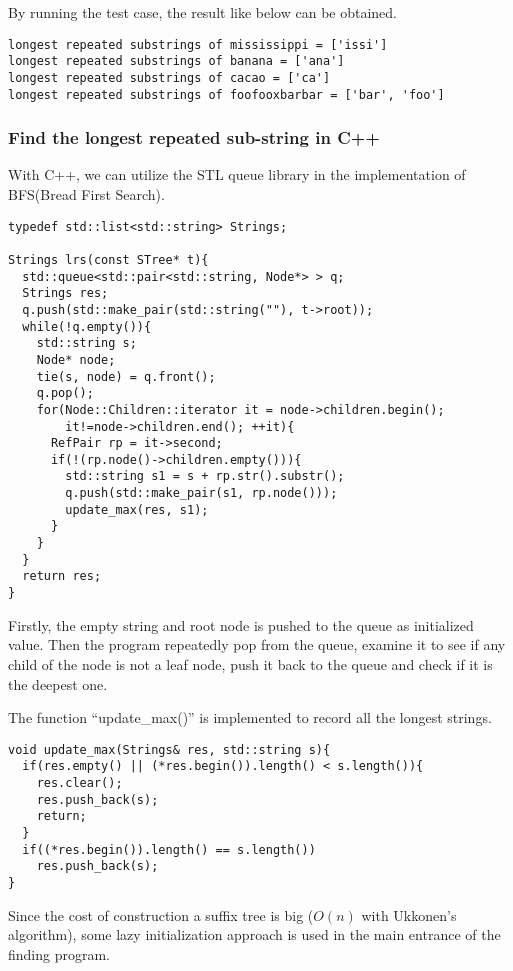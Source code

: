 \documentclass{article}
\begin{document}
By running the test case, the result like below can be obtained.

\begin{verbatim}
longest repeated substrings of mississippi = ['issi']
longest repeated substrings of banana = ['ana']
longest repeated substrings of cacao = ['ca']
longest repeated substrings of foofooxbarbar = ['bar', 'foo']
\end{verbatim}

\subsubsection*{Find the longest repeated sub-string in C++}
With C++, we can utilize the STL queue library in the implementation
of BFS(Bread First Search). 

\lstset{language=C++}
\begin{lstlisting}
typedef std::list<std::string> Strings;

Strings lrs(const STree* t){
  std::queue<std::pair<std::string, Node*> > q;
  Strings res;
  q.push(std::make_pair(std::string(""), t->root));
  while(!q.empty()){
    std::string s;
    Node* node;
    tie(s, node) = q.front();
    q.pop();
    for(Node::Children::iterator it = node->children.begin();
        it!=node->children.end(); ++it){
      RefPair rp = it->second;
      if(!(rp.node()->children.empty())){
        std::string s1 = s + rp.str().substr();
        q.push(std::make_pair(s1, rp.node()));
        update_max(res, s1);
      }
    }
  }
  return res;
} 
\end{lstlisting}

Firstly, the empty string and root node is pushed to the queue
as initialized value. Then the program repeatedly pop from the queue,
examine it to see if any child of the node is not a leaf node,
push it back to the queue and check if it is the deepest one.

The function ``update\_max()'' is implemented to record all the
longest strings.

\begin{lstlisting}
void update_max(Strings& res, std::string s){
  if(res.empty() || (*res.begin()).length() < s.length()){
    res.clear();
    res.push_back(s);
    return;
  }
  if((*res.begin()).length() == s.length())
    res.push_back(s);
}
\end{lstlisting}

Since the cost of construction a suffix tree is big ($O(n)$ with
Ukkonen's algorithm), some lazy initialization approach is used in
the main entrance of the finding program.
\end{document}
